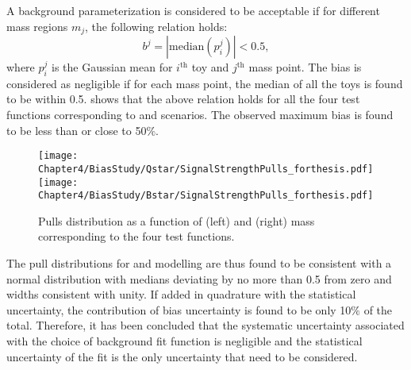 A background parameterization is considered to be acceptable if for different mass regions $m_{j}$, the following relation holds:
\begin{equation}
b^{j} = |\textrm{median}(p^{j}_{i})| < 0.5,
\end{equation}
where $p^{j}_{i}$ is the Gaussian mean for $i^{\textrm{th}}$ toy and $j^{\textrm{th}}$ mass point. The bias is considered as negligible if for each mass point, 
the median of all the toys is found to be within 0.5. \fig{\ref{fig:pulls_vs_mass}} shows that the above relation holds for all the four
test functions corresponding to \qstar and \bstar scenarios. The observed maximum bias is found to be less than or close to 50$\%$.

\begin{figure}[htbp]
\begin{center}
\texttt{[image: Chapter4/BiasStudy/Qstar/SignalStrengthPulls\_forthesis.pdf]}
\texttt{[image: Chapter4/BiasStudy/Bstar/SignalStrengthPulls\_forthesis.pdf]}        
\caption{Pulls distribution as a function of \qstar (left) and \bstar (right) mass corresponding to the four test functions.}
\label{fig:pulls_vs_mass}
\end{center}
\end{figure}
\vspace{-0.1in}

The pull distributions for \qstar and \bstar modelling are thus found to be consistent with a normal distribution with medians deviating by no more than 0.5 from zero
and widths consistent with unity. If added in quadrature with the statistical uncertainty, the contribution of bias uncertainty is found to be only 10$\%$ of the total.
Therefore, it has been concluded that the systematic uncertainty associated with the choice of background fit function is negligible and the statistical uncertainty
of the fit is the only uncertainty that need to be considered.
